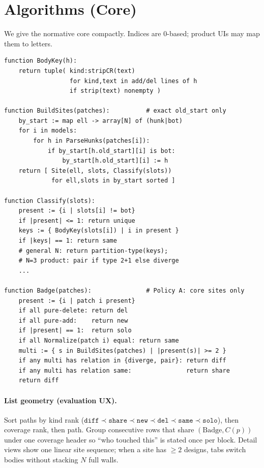 \documentclass[
  11pt,
  a4paper,
  oneside,
  numbers=noenddot,
  abstract=true,
  headings=normal,
  DIV=11,
  BCOR=0mm,
]{scrartcl}
\theoremstyle{definition}
\theoremstyle{plain}
\theoremstyle{remark}
\newcommand{\badge}[1]{\texttt{#1}}
\newcommand{\Badge}{\mathrm{Badge}}
\begin{document}
\section{Algorithms (Core)}
\label{sec:algo}

We give the normative core compactly. Indices are $0$-based; product UIs
may map them to letters.

\begin{lstlisting}[caption={Normative core: sites, body keys, path badge.},label={lst:core}]
function BodyKey(h):
    return tuple( kind:stripCR(text)
                  for kind,text in add/del lines of h
                  if strip(text) nonempty )

function BuildSites(patches):          # exact old_start only
    by_start := map ell -> array[N] of (hunk|bot)
    for i in models:
        for h in ParseHunks(patches[i]):
            if by_start[h.old_start][i] is bot:
                by_start[h.old_start][i] := h
    return [ Site(ell, slots, Classify(slots))
             for ell,slots in by_start sorted ]

function Classify(slots):
    present := {i | slots[i] != bot}
    if |present| <= 1: return unique
    keys := { BodyKey(slots[i]) | i in present }
    if |keys| == 1: return same
    # general N: return partition-type(keys);
    # N=3 product: pair if type 2+1 else diverge
    ...

function Badge(patches):               # Policy A: core sites only
    present := {i | patch i present}
    if all pure-delete: return del
    if all pure-add:    return new
    if |present| == 1:  return solo
    if all Normalize(patch i) equal: return same
    multi := { s in BuildSites(patches) | |present(s)| >= 2 }
    if any multi has relation in {diverge, pair}: return diff
    if any multi has relation same:               return share
    return diff
\end{lstlisting}

\paragraph{List geometry (evaluation UX).}
Sort paths by kind rank
($\badge{diff}\prec\badge{share}\prec\badge{new}\prec\badge{del}\prec\badge{same}\prec\badge{solo}$),
then coverage rank, then path. Group consecutive rows that share
$(\Badge, C(p))$ under one coverage header so ``who touched this'' is
stated once per block. Detail views show one linear site sequence; when a
site has $\ge 2$ designs, tabs switch bodies without stacking $N$ full
walls.
\end{document}
